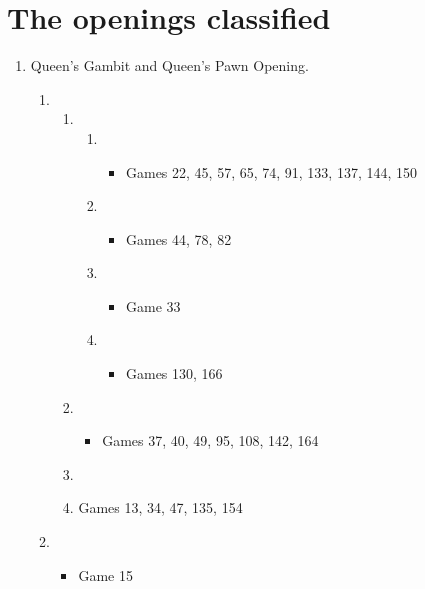 \chapter{The openings classified}


\begin{enumerate}
\item Queen's Gambit and Queen's Pawn Opening.

\begin{enumerate}
\item \newgame{}
\begin{enumerate}
\item {}
\begin{enumerate}
\item {}
\begin{itemize}
\item Games 22, 45, 57, 65, 74, 91, 133, 137, 144, 150
\end{itemize}
\item {}
\begin{itemize}
\item Games 44, 78, 82
\end{itemize}
\item {}
\begin{itemize}
\item Game 33 
\end{itemize}
\item {}
\begin{itemize}
\item Games 130, 166
\end{itemize}
\end{enumerate}
\item {}
\begin{itemize}
\item Games 37, 40, 49, 95, 108, 142, 164
\end{itemize}
\item {}
\item Games 13, 34, 47, 135, 154
\end{enumerate}
\item \newgame{}
\begin{itemize}
\item Game 15
\end{itemize}

\end{enumerate}
\end{enumerate}

